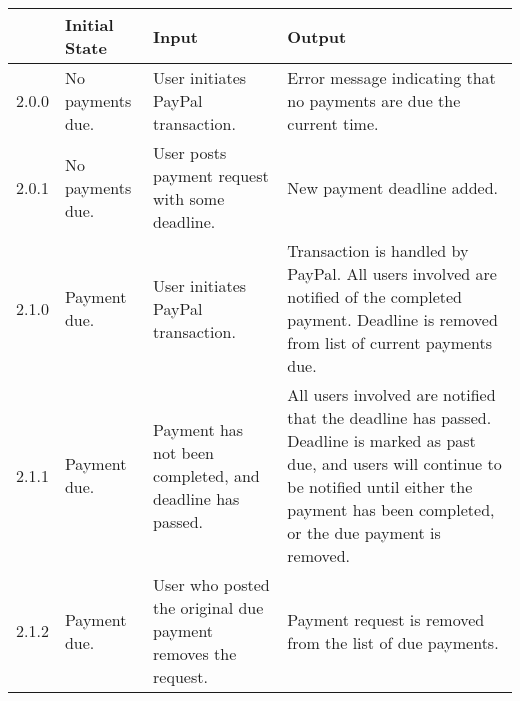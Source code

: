 \documentclass[12pt]{article}
\begin{document}
\begin{longtable}{|p{2cm}|p{3cm}|p{5cm}|p{5cm}|}
\begin{longtable}{|p{2cm}|p{3cm}|p{5cm}|p{5cm}|}
  \hline
  \textbf{Test Case} & \textbf{Initial State} & \textbf{Input} & \textbf{Output} \\ \hline
  2.0.0 & No payments due. & User initiates PayPal transaction. & Error message indicating that no payments are due the current time.\\
  \hline
  2.0.1 & No payments due. & User posts payment request with some deadline. & New payment deadline added.\\
  \hline
  2.1.0 & Payment due. & User initiates PayPal transaction. & Transaction is handled by PayPal. All users involved are notified of the completed payment. Deadline is removed from list of current payments due.\\
  \hline
  2.1.1 & Payment due. & Payment has not been completed, and deadline has passed. & All users involved are notified that the deadline has passed. Deadline is marked as past due, and users will continue to be notified until either the payment has been completed, or the due payment is removed.\\
  \hline
  2.1.2 & Payment due. & User who posted the original due payment removes the request. & Payment request is removed from the list of due payments.\\
  \hline
\end{longtable}
\end{document}
